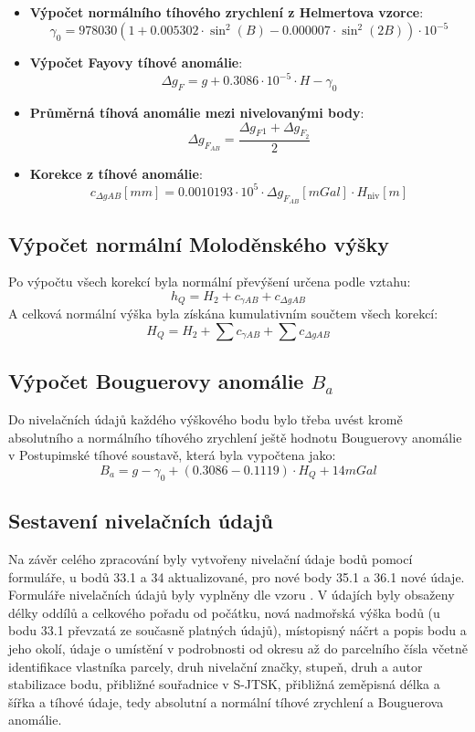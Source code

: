 \begin{itemize}
    \item \textbf{Výpočet normálního tíhového zrychlení z Helmertova vzorce}: 
    \[
    \gamma_0 = 978030 \left(1 + 0.005302 \cdot \sin^2(B) - 0.000007 \cdot \sin^2(2B) \right) \cdot 10^{-5}
    \]
    \item \textbf{Výpočet Fayovy tíhové anomálie}:
    \[
    \Delta g_F = g + 0.3086 \cdot 10^{-5} \cdot H - \gamma_0
    \]
    \item \textbf{Průměrná tíhová anomálie mezi nivelovanými body}:
    \[
    \Delta g_{F_{AB}} = \frac{\Delta g_F{_{1}} + \Delta g_{F_{2}}}{2}
    \]
    \item \textbf{Korekce z tíhové anomálie}:
    \[
    c_{\Delta g AB}[mm] = 0.0010193 \cdot 10^5 \cdot \Delta g_{F_{AB}}[mGal] \cdot H_{\text{niv}}[m]
    \]
\end{itemize}

\subsection*{Výpočet normální Moloděnského výšky}
Po výpočtu všech korekcí byla normální převýšení určena podle vztahu:
\[
h_Q = H_{2} + c_{\gamma AB} + c_{\Delta g AB}
\]
A celková normální výška byla získána kumulativním součtem všech korekcí:
\[
H_Q = H_{2} + \sum c_{\gamma AB} + \sum c_{\Delta g AB}
\]

\subsection{Výpočet Bouguerovy anomálie \(B_a\)}
Do nivelačních údajů každého výškového bodu bylo třeba uvést kromě absolutního a normálního tíhového zrychlení ještě hodnotu Bouguerovy anomálie v Postupimské tíhové soustavě, která byla vypočtena jako:
\[
B_a = g - \gamma_0 + (0.3086 - 0.1119)\cdot H_Q + 14 mGal
\]

\subsection{Sestavení nivelačních údajů}
Na závěr celého zpracování byly vytvořeny nivelační údaje bodů pomocí formuláře, u bodů 33.1 a 34 aktualizované, pro nové body 35.1 a 36.1 nové údaje. Formuláře nivelačních údajů byly vyplněny dle vzoru \cite{skorepa}. V údajích byly obsaženy délky oddílů a celkového pořadu od počátku, nová nadmořská výška bodů (u bodu 33.1 převzatá ze současně platných údajů), místopisný náčrt a popis bodu a jeho okolí, údaje o umístění v podrobnosti od okresu až do parcelního čísla včetně identifikace vlastníka parcely, druh nivelační značky, stupeň, druh a autor stabilizace bodu, přibližné souřadnice v S-JTSK, přibližná zeměpisná délka a šířka a tíhové údaje, tedy absolutní a normální tíhové zrychlení a Bouguerova anomálie.